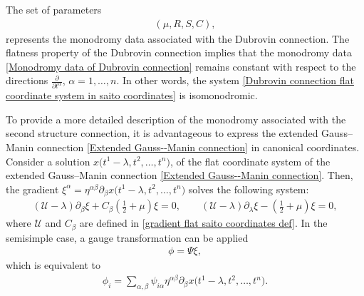 \documentclass[11pt]{article}
\numberwithin{equation}{section}
\numberwithin{equation}{section}
\begin{document}
The set of parameters
\begin{gather}\label{Monodromy data of Dubrovin connection}
 (\mu, R, S, C),
\end{gather}
represents the monodromy data associated with the Dubrovin connection. The flatness property of the Dubrovin connection implies that the monodromy data \eqref{Monodromy data of Dubrovin connection} remains constant with respect to the directions $\frac{\partial}{\partial t^{\alpha}}$, $\alpha=1, \dots, n$. In other words, the system \eqref{Dubrovin connection flat coordinate system in saito coordinates} is isomonodromic.

To provide a more detailed description of the monodromy associated with the second structure connection, it is advantageous to express the extended Gauss--Manin connection \eqref{Extended Gauss--Manin connection} in canonical coordinates. Consider a solution
$
 x\bigl(t^1-\lambda, t^2, \dots, t^n\bigr)$,
of the flat coordinate system of the extended Gauss--Manin connection \eqref{Extended Gauss--Manin connection}. Then, the gradient
${
 \xi^{\alpha} = \eta^{\alpha\beta}\partial_{\beta}x\bigl(t^1-\lambda, t^2, \dots, t^n\bigr)}
$
solves the following system:
\begin{gather}
 (\mathcal{U}-\lambda)\partial_{\beta}\xi + C_{\beta}\left(\frac{1}{2}+\mu\right)\xi = 0,\qquad
 (\mathcal{U}-\lambda)\partial_{\lambda}\xi - \left(\frac{1}{2}+\mu\right)\xi = 0,\label{Extended Gauss manin in matrix form flat Saito}
\end{gather}
where $\mathcal{U}$ and $C_{\beta}$ are defined in \eqref{gradient flat saito coordinates def}.
In the semisimple case, a gauge transformation can be applied
\begin{gather}\label{gauge transform canonical coordinate}
 \phi = \Psi\xi,
\end{gather}
which is equivalent to
\begin{gather}\label{gauge transform canonical coordinate part 2}
 \phi_i = \sum_{\alpha,\beta}\psi_{i\alpha}\eta^{\alpha\beta}\partial_{\beta}x\bigl(t^1-\lambda,t^2,\dots,t^n\bigr).
\end{gather}
\end{document}
